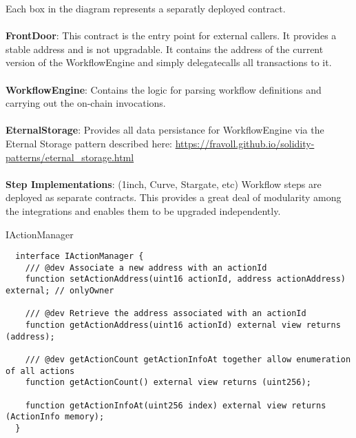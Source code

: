 \documentclass[oneside]{article}
\begin{document}
\noindent Each box in the diagram represents a separatly deployed contract.
\\
\\
\noindent \textbf{FrontDoor}:  This contract is the entry point for external callers.  It provides a stable address and is not upgradable.  
It contains the address of the current version of the  WorkflowEngine and simply delegatecalls all transactions to it.
\\
\\
\noindent \textbf{WorkflowEngine}:  Contains the logic for parsing workflow definitions and carrying out the on-chain invocations.
\\
\\
\noindent \textbf{EternalStorage}:  Provides all data persistance for WorkflowEngine via the Eternal Storage pattern described here: \url{https://fravoll.github.io/solidity-patterns/eternal_storage.html}
\\
\\
\noindent \textbf{Step Implementations}:  (1inch, Curve, Stargate, etc) Workflow steps are deployed as separate contracts.  
This provides a great deal of modularity among the integrations and enables them to be upgraded independently. 

\noindent IActionManager

\begin{verbatim}
  interface IActionManager {
    /// @dev Associate a new address with an actionId
    function setActionAddress(uint16 actionId, address actionAddress) external; // onlyOwner
  
    /// @dev Retrieve the address associated with an actionId
    function getActionAddress(uint16 actionId) external view returns (address);
  
    /// @dev getActionCount getActionInfoAt together allow enumeration of all actions
    function getActionCount() external view returns (uint256);
  
    function getActionInfoAt(uint256 index) external view returns (ActionInfo memory);
  }
  
\end{verbatim}
\end{document}
